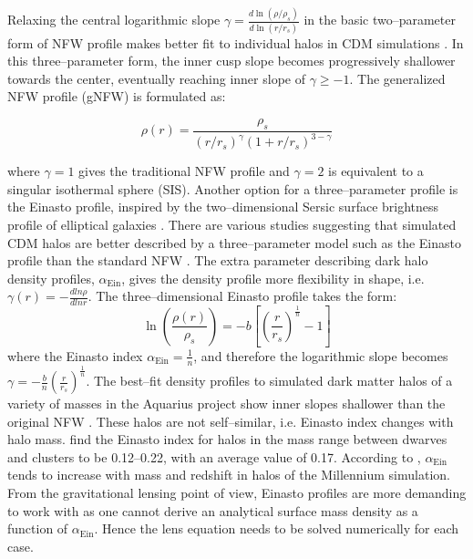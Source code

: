 \documentclass[a4wide,12pt]{book}
\begin{document}
{Relaxing the central logarithmic slope $\gamma = \frac{d\ln(\rho/\rho_s)}{d\ln(r/r_s)}$ in the basic two--parameter form of NFW profile makes better fit to individual halos in CDM simulations \citep[][]{}. %
 In this three--parameter form, the inner cusp slope becomes progressively shallower towards the center, eventually reaching inner slope of $\gamma\geq-1$. The generalized NFW profile (gNFW) is formulated as:

\begin{equation}
\rho(r) = \frac{\rho_s}{(r / r_s)^\gamma(1 + r/r_s)^{3-\gamma}}
\end{equation}

where $\gamma = 1$ gives the traditional NFW profile and $\gamma = 2$ is equivalent to a singular isothermal sphere (SIS). Another option for a three--parameter profile is the Einasto profile, inspired by the two--dimensional Sersic surface brightness profile of elliptical galaxies \citep[][]{Einasto1965}. There are various studies suggesting that simulated CDM halos are better described by a three--parameter model such as the Einasto profile than the standard NFW \citep[e.g.][]{Navarro+2004, Gao+2008, DiCintio+2014, Dutton.Maccio2014}. The extra parameter describing dark halo density profiles, $\alpha_\mathrm{Ein}$, gives the density profile more flexibility in shape, i.e. $\gamma(r)=-\frac{dln\rho}{dlnr}$. The three--dimensional Einasto profile takes the form:
\begin{equation}
\ln\left(\frac{\rho(r)}{\rho_s}\right) = -b\left[\left(\frac{r}{r_s}\right)^{\frac{1}{n}} - 1\right]
\end{equation}
where the Einasto index $\alpha_\mathrm{Ein} = \frac{1}{n}$, and therefore the logarithmic slope becomes $\gamma = -\frac{b}{n}(\frac{r}{r_s})^\frac{1}{n}$. The best--fit density profiles to simulated dark matter halos of a variety of masses in the Aquarius project show inner slopes shallower than the original NFW \citep{Navarro+2010}. These halos are not self--similar, i.e. Einasto index changes with halo mass. \citet{Navarro+2004} find the Einasto index for halos in the mass range between dwarves and clusters to be 0.12--0.22, with an average value of 0.17. According to \citet{Hayashi.White2008, Gao+2008}, $\alpha_\mathrm{Ein}$ tends to increase with mass and redshift in halos of the Millennium simulation. From the gravitational lensing point of view, Einasto profiles are more demanding to work with as one cannot derive an analytical surface mass density as a function of $\alpha_\mathrm{Ein}$. Hence the lens equation needs to be solved numerically for each case.

}
\end{document}
